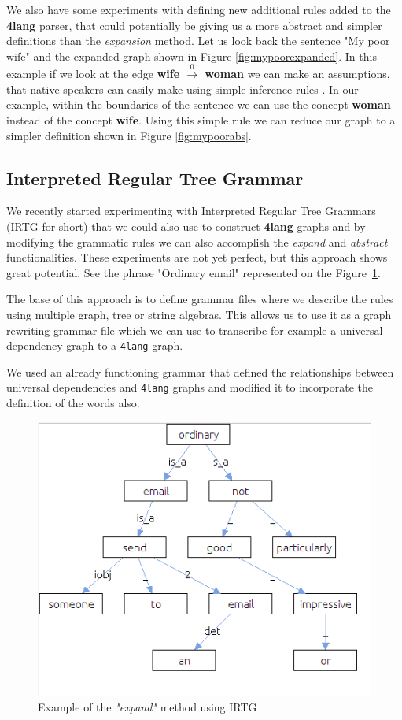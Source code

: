 We also have some experiments with defining new additional rules added to the \textbf{4lang} parser, that could potentially be giving us a more abstract and simpler definitions than the \textit{expansion} method. Let us look back the sentence "My poor wife" and the expanded graph shown in Figure \ref{fig:mypoorexpanded}. In this example if we look at the edge \textbf{wife $\xrightarrow0$ woman} we can make an assumptions, that native speakers can easily make using simple inference rules \cite{Kovacs:2018}. In our example, within the boundaries of the sentence we can use the concept \textbf{woman} instead of the concept \textbf{wife}. Using this simple rule we can reduce our graph to a simpler definition shown in Figure \ref{fig:mypoorabs}.

\subsection{Interpreted Regular Tree Grammar}
We recently started experimenting with Interpreted Regular Tree Grammars \cite{Koller:2011} (IRTG for short) that we could also use to construct \textbf{4lang} graphs and by modifying the grammatic rules we can also accomplish the \textit{expand} and \textit{abstract} functionalities. These experiments are not yet perfect, but this approach shows great potential. See the phrase "Ordinary email" represented on the Figure~\ref{fig:irtg}.

The base of this approach is to define grammar files where we describe the rules using multiple graph, tree or string algebras. This allows us to use it as a graph rewriting grammar file which we can use to transcribe for example a universal dependency graph to a \texttt{4lang} graph.

We used an already functioning grammar that defined the relationships between universal dependencies and \texttt{4lang} graphs and modified it to incorporate the definition of the words also.

\begin{figure}[h]
	\centering
	\includegraphics[scale=0.4]{irtg.jpg}
	\caption{Example of the \textit{"expand"} method using IRTG}
	\label{fig:irtg}
\end{figure}